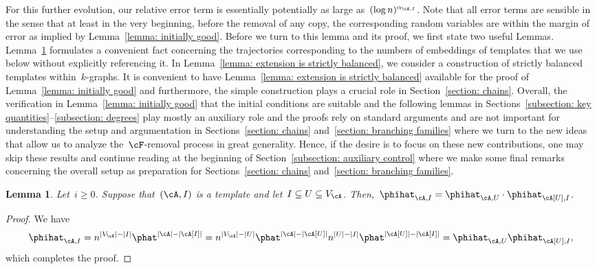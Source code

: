 \documentclass[11pt]{amsart}
\DeclarePairedDelimiter{\abs}{\lvert}{\rvert}
\newtheorem{lemma}[algocf]{Lemma}
\theoremstyle{definition}
\numberwithin{equation}{section}
\begin{document}
	For this further evolution, our relative error term is essentially potentially as large as~$(\log n)^{\alpha_{\cA,I}}$.
	Note that all error terms are sensible in the sense that at least in the very beginning, before the removal of any copy, the corresponding random variables are within the margin of error as implied by Lemma~\ref{lemma: initially good}.
	Before we turn to this lemma and its proof, we first state two useful Lemmas.
	Lemma~\ref{lemma: extension trajectory split} formulates a convenient fact concerning the trajectories corresponding to the numbers of embeddings of templates that we use below without explicitly referencing it.
	In Lemma~\ref{lemma: extension is strictly balanced}, we consider a construction of strictly balanced templates within~$k$-graphs.
	It is convenient to have Lemma~\ref{lemma: extension is strictly balanced} available for the proof of Lemma~\ref{lemma: initially good} and furthermore, the simple construction plays a crucial role in Section~\ref{section: chains}.
	Overall, the verification in Lemma~\ref{lemma: initially good} that the initial conditions are suitable and the following lemmas in Sections~\ref{subsection: key quantities}--\ref{subsection: degrees} play mostly an auxiliary role and the proofs rely on standard arguments and are not important for understanding the setup and argumentation in Sections~\ref{section: chains} and~\ref{section: branching families} where we turn to the new ideas that allow us to analyze the~$\cF$-removal process in great generality.
	Hence, if the desire is to focus on these new contributions, one may skip these results and continue reading at the beginning of Section~\ref{subsection: auxiliary control} where we make some final remarks concerning the overall setup as preparation for Sections~\ref{section: chains} and~\ref{section: branching families}.

	\begin{lemma}\label{lemma: extension trajectory split}
		Let~$i\geq 0$.
		Suppose that~$(\cA,I)$ is a template and let~$I\subseteq U\subseteq V_\cA$.
		Then,~$\phihat_{\cA,I}=\phihat_{\cA,U}\cdot\phihat_{\cA[U],I}$.
	\end{lemma}
	
	\begin{proof}
		We have
		\begin{equation*}
			\phihat_{\cA,I}
			=n^{\abs{V_\cA}-\abs{I}}\phat^{\abs{\cA}-\abs{\cA[I]}}
			=n^{\abs{V_\cA}-\abs{U}}\phat^{\abs{\cA}-\abs{\cA[U]}}n^{\abs{U}-\abs{I}}\phat^{\abs{\cA[U]}-\abs{\cA[I]}}
			=\phihat_{\cA,U}\phihat_{\cA[U],I},
		\end{equation*}
		which completes the proof.
	\end{proof}
	
\end{document}
